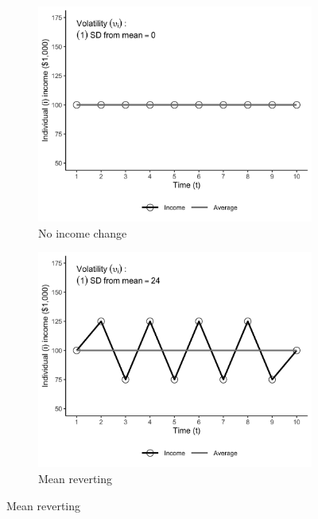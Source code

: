 \documentclass[12pt]{article}
\begin{document}
\begin{figure}[htp!]
    \caption{Examples of income, volatility, and direction} 
    \label{examples}
    \centering
    \begin{subfigure}[b]{0.45\textwidth}
        \includegraphics[width=\textwidth]{../graphs/example_1.png}
        \caption{No income change}
        \label{examples_sub1}
    \end{subfigure}
    \begin{subfigure}[b]{0.45\textwidth}
        \includegraphics[width=\textwidth]{../graphs/example_2.png}
        \caption{Mean reverting}
        \label{examples_sub2}
    \end{subfigure}

\end{figure}
\end{document}
